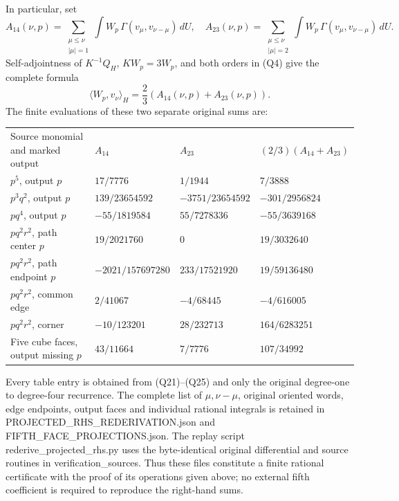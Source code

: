 \documentclass[11pt]{article}
\begin{document}
In particular, set
\[
 A_{14}(\nu,p)=\sum_{\substack{\mu\le\nu\\|\mu|=1}}
          \int W_p\,\Gamma(v_\mu,v_{\nu-\mu})\,dU,\quad
 A_{23}(\nu,p)=\sum_{\substack{\mu\le\nu\\|\mu|=2}}
          \int W_p\,\Gamma(v_\mu,v_{\nu-\mu})\,dU.
\]
Self-adjointness of \(K^{-1}Q_H\), \(KW_p=3W_p\), and both orders in (Q4) give the complete formula
\[
 \langle W_p,v_\nu\rangle_H=\frac23(A_{14}(\nu,p)+A_{23}(\nu,p)).
 \tag{Q25}
\]
The finite evaluations of these two separate original sums are:

\begingroup\small\setlength{\tabcolsep}{3pt}\begin{longtable}{@{}p{}p{}p{}p{}@{}}\toprule
Source monomial and marked output & \(A_{14}\) & \(A_{23}\) & \((2/3)(A_{14}+A_{23})\)\\
\(p^5\), output \(p\) & \(17/7776\) & \(1/1944\) & \(7/3888\)\\
\(p^3q^2\), output \(p\) & \(139/23654592\) & \(-3751/23654592\) & \(-301/2956824\)\\
\(pq^4\), output \(p\) & \(-55/1819584\) & \(55/7278336\) & \(-55/3639168\)\\
\(pq^2r^2\), path center \(p\) & \(19/2021760\) & \(0\) & \(19/3032640\)\\
\(pq^2r^2\), path endpoint \(p\) & \(-2021/157697280\) & \(233/17521920\) & \(19/59136480\)\\
\(pq^2r^2\), common edge & \(2/41067\) & \(-4/68445\) & \(-4/616005\)\\
\(pq^2r^2\), corner & \(-10/123201\) & \(28/232713\) & \(164/6283251\)\\
Five cube faces, output missing \(p\) & \(43/11664\) & \(7/7776\) & \(107/34992\)\\
\bottomrule\end{longtable}\endgroup

Every table entry is obtained from (Q21)–(Q25) and only the original degree-one to degree-four recurrence. The complete list of \(\mu,\nu-\mu\), original oriented words, edge endpoints, output faces and individual rational integrals is retained in PROJECTED\_RHS\_REDERIVATION.json and FIFTH\_FACE\_PROJECTIONS.json. The replay script rederive\_projected\_rhs.py uses the byte-identical original differential and source routines in verification\_sources. Thus these files constitute a finite rational certificate with the proof of its operations given above; no external fifth coefficient is required to reproduce the right-hand sums.
\end{document}
